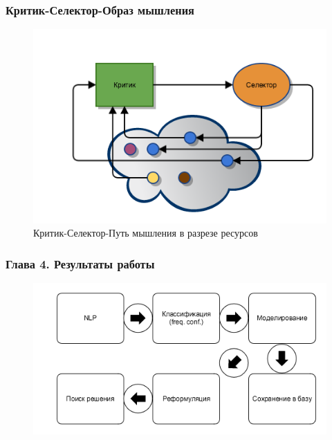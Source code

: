 \documentclass[14pt]{beamer}
\begin{document}
\begin{frame}
\frametitle{Критик-Селектор-Образ мышления}
\begin{figure} [h] 
  \center
  \includegraphics [scale=0.6] {CSW_EX}
  \caption{Критик-Селектор-Путь мышления в разрезе ресурсов} 
  \label{img:csw_ex}  
\end{figure}
\end{frame}

\begin{frame}
\frametitle{Глава 4. Результаты работы}
\begin{figure} [h] 
  \center
  \includegraphics [scale=0.6] {workflow}
  \caption{} 
  \label{img:workflow}  
\end{figure}
\end{frame}
\end{document}
